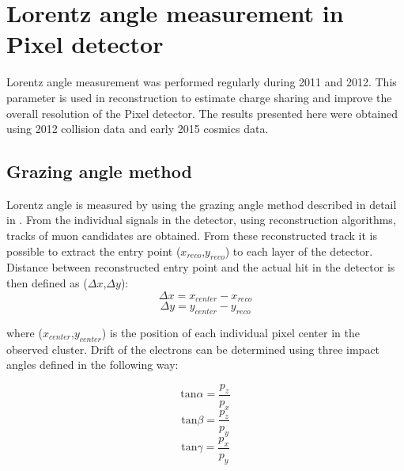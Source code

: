 
\chapter{Lorentz angle measurement in Pixel detector} %

\label{app:LA} %


Lorentz angle measurement was performed regularly during 2011 and 2012. This parameter is used in reconstruction to estimate charge sharing and improve the overall resolution of the Pixel detector. The results presented here were obtained using 2012 collision data and early 2015 cosmics data. 

\section{Grazing angle method}
Lorentz angle is measured by using the grazing angle method described in detail in \cite{Henrich}. From the individual signals in the detector, using reconstruction algorithms, tracks of muon candidates are obtained. From these reconstructed track it is possible to extract the entry point ($x_{reco}$,$y_{reco}$) to each layer of the detector. 
Distance between reconstructed entry point and the actual hit in the detector is then defined as ($\Delta x$,$\Delta y$):
\begin{equation}
\Delta x = x_{center}-x_{reco}
\end{equation} 
\begin{equation}
\Delta y = y_{center}-y_{reco}
\end{equation} 

where ($x_{center}$,$y_{center}$) is the position of each individual pixel center in the observed cluster. Drift of the electrons can be determined using three impact angles defined in the following way:

\begin{equation}
\text{tan} \alpha = \frac{p_z}{p_x}
\end{equation}
\begin{equation}
\text{tan} \beta = \frac{p_z}{p_y}
\end{equation}
\begin{equation}
\text{tan} \gamma = \frac{p_x}{p_y}
\end{equation}


